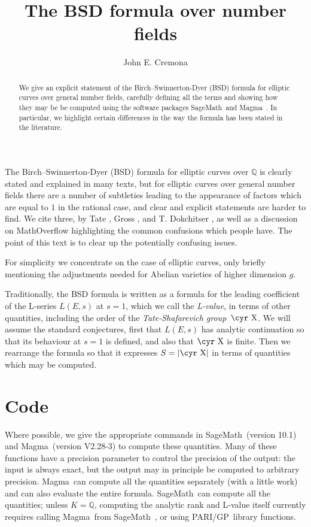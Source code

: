 \documentclass{amsart}
\newcommand{\software}[1]{\textsf{#1}} %
\newcommand{\Sage}{\software{SageMath}{}\ }
\newcommand{\Magma}{\software{Magma}{}\ }
\newcommand{\GP}{\software{PARI/GP}{}\ }
\newcommand{\Sha}{\text{\cyr X}}
\newcommand\Q{\mathbb{Q}}
\begin{document}
\title{The BSD formula over number fields}
\author{John E. Cremona}

\begin{abstract}
  We give an explicit statement of the Birch--Swinnerton-Dyer (BSD)
  formula for elliptic curves over general number fields, carefully
  defining all the terms and showing how they may be be computed using
  the software packages \Sage and \Magma.  In particular, we highlight
  certain differences in the way the formula has been stated in the
  literature.
\end{abstract}

\maketitle

The Birch--Swinnerton-Dyer (BSD) formula for elliptic curves over
\(\Q\) is clearly stated and explained in many texts, but for elliptic
curves over general number fields there are a number of subtleties
leading to the appearance of factors which are equal to \(1\) in the
rational case, and clear and explicit statements are harder to
find. We cite three, by Tate \cite{Tate}, Gross \cite{Gross}, and
T. Dokchitser \cite{Dok}, as well as a discussion on MathOverflow
\cite{MO} highlighting the common confusions which people have. The
point of this text is to clear up the potentially confusing issues.

For simplicity we concentrate on the case of elliptic curves, only
briefly mentioning the adjustments needed for Abelian varieties of
higher dimension \(g\).

Traditionally, the BSD formula is written as a formula for the leading
coefficient of the L-series \(L(E,s)\) at \(s=1\), which we call the
\emph{L-value}, in terms of other quantities, including the order of
the \emph{Tate-Shafarevich group}~$\Sha$. We will assume the standard
conjectures, first that \(L(E,s)\) has analytic continuation so that
its behaviour at \(s=1\) is defined, and also that $\Sha$ is finite. Then
we rearrange the formula so that it expresses \(S=|\Sha|\) in terms of
quantities which may be computed.

\section{Code}\label{code}

Where possible, we give the appropriate commands in \Sage (version
10.1) and \Magma (version V2.28-3) to compute these quantities. Many
of these functions have a precision parameter to control the precision
of the output: the input is always exact, but the output may in
principle be computed to arbitrary precision. \Magma can compute all
the quantities separately (with a little work) and can also evaluate
the entire formula. \Sage can compute all the quantities; unless
\(K=\Q\), computing the analytic rank and L-value itself currently
requires calling \Magma from \Sage, or using \GP library functions.
\end{document}
